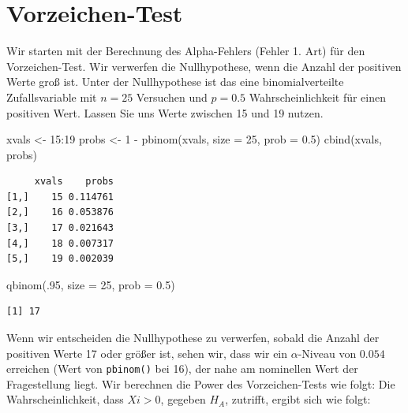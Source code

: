\documentclass[
  ngerman,
]{scrbook}
\newenvironment{Shaded}{\begin{snugshade}}{\end{snugshade}}
\newcommand{\AttributeTok}[1]{\textcolor[rgb]{0.77,0.63,0.00}{#1}}
\newcommand{\DecValTok}[1]{\textcolor[rgb]{0.00,0.00,0.81}{#1}}
\newcommand{\FloatTok}[1]{\textcolor[rgb]{0.00,0.00,0.81}{#1}}
\newcommand{\FunctionTok}[1]{\textcolor[rgb]{0.00,0.00,0.00}{#1}}
\newcommand{\NormalTok}[1]{#1}
\newcommand{\OtherTok}[1]{\textcolor[rgb]{0.56,0.35,0.01}{#1}}
\newcommand{\SpecialCharTok}[1]{\textcolor[rgb]{0.00,0.00,0.00}{#1}}
\begin{document}
\hypertarget{vorzeichen-test}{%
\section{Vorzeichen-Test}\label{vorzeichen-test}}

Wir starten mit der Berechnung des Alpha-Fehlers (Fehler 1. Art) für den Vorzeichen-Test. Wir verwerfen die Nullhypothese, wenn die Anzahl der positiven Werte groß ist. Unter der Nullhypothese ist das eine binomialverteilte Zufallsvariable mit \(n = 25\) Versuchen und \(p = 0.5\) Wahrscheinlichkeit für einen positiven Wert. Lassen Sie uns Werte zwischen 15 und 19 nutzen.

\begin{Shaded}
\begin{Highlighting}[]
\NormalTok{xvals }\OtherTok{\textless{}{-}} \DecValTok{15}\SpecialCharTok{:}\DecValTok{19}
\NormalTok{probs }\OtherTok{\textless{}{-}} \DecValTok{1} \SpecialCharTok{{-}} \FunctionTok{pbinom}\NormalTok{(xvals, }\AttributeTok{size =} \DecValTok{25}\NormalTok{, }\AttributeTok{prob =} \FloatTok{0.5}\NormalTok{)}
\FunctionTok{cbind}\NormalTok{(xvals, probs)}
\end{Highlighting}
\end{Shaded}

\begin{verbatim}
     xvals    probs
[1,]    15 0.114761
[2,]    16 0.053876
[3,]    17 0.021643
[4,]    18 0.007317
[5,]    19 0.002039
\end{verbatim}

\begin{Shaded}
\begin{Highlighting}[]
\FunctionTok{qbinom}\NormalTok{(.}\DecValTok{95}\NormalTok{, }\AttributeTok{size =} \DecValTok{25}\NormalTok{, }\AttributeTok{prob =} \FloatTok{0.5}\NormalTok{)}
\end{Highlighting}
\end{Shaded}

\begin{verbatim}
[1] 17
\end{verbatim}

Wenn wir entscheiden die Nullhypothese zu verwerfen, sobald die Anzahl der positiven Werte 17 oder größer ist, sehen wir, dass wir ein \(\alpha\)-Niveau von \(0.054\) erreichen (Wert von \texttt{pbinom()} bei 16), der nahe am nominellen Wert der Fragestellung liegt.
Wir berechnen die Power des Vorzeichen-Tests wie folgt: Die Wahrscheinlichkeit, dass \(Xi > 0\), gegeben \(H_A\), zutrifft, ergibt sich wie folgt:
\end{document}
